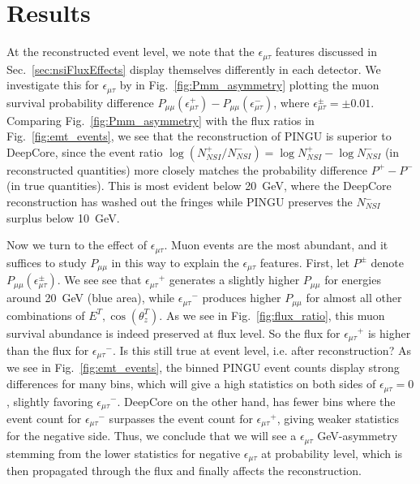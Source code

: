 \documentclass[draft=True]{revtex4-2}
\newcommand{\ztrue}{\ensuremath{\cos{(\theta_z^{T})}}}
\newcommand{\emt}{\ensuremath{\epsilon_{\mu\tau}}}
\newcommand{\Etrue}{E^{T}}
\begin{document}
\section{Results}
At the reconstructed event level, we note that the $\emt$ features discussed in Sec.~\ref{sec:nsiFluxEffects} display themselves differently in each detector.
We investigate this for $\emt$ by in Fig.~\ref{fig:Pmm_asymmetry} plotting the muon survival probability difference $P_{\mu\mu}(\epsilon^+_{\mu\tau}) - P_{\mu\mu}(\epsilon^-_{\mu\tau})$, where 
$\epsilon^\pm_{\mu\tau} = \pm 0.01$.
Comparing Fig.~\ref{fig:Pmm_asymmetry} with the flux ratios in Fig.~\ref{fig:emt_events}, we see that the reconstruction of PINGU is
superior to DeepCore, since the event ratio $\log{(N^+_{NSI}/N^-_{NSI})} = \log{N^+_{NSI}} - \log{N^-_{NSI}}$ (in reconstructed quantities) 
more closely matches the probability difference $P^+-P^-$ (in true quantities).
This is most evident below \SI{20}{\GeV}, where the DeepCore reconstruction has washed out the fringes while PINGU preserves the $N^-_{NSI}$ surplus below \SI{10}{\GeV}.

Now we turn to the effect of $\emt$. Muon events are the most abundant, and it suffices to study $P_{\mu\mu}$ in this way to explain the $\emt$ features. 
First, let $P^\pm$ denote $P_{\mu\mu}(\epsilon^\pm_{\mu\tau})$. 
We see see that $\emt^+$ generates a slightly higher $P_{\mu\mu}$ for energies around \SI{20}{\GeV} (blue area),
while $\emt^-$ produces higher $P_{\mu\mu}$ for almost all other combinations of ${\Etrue,\ztrue}$. As we see in Fig.~\ref{fig:flux_ratio}, this muon survival abundance 
is indeed preserved at flux level. So the flux for $\emt^+$ is higher than the flux for $\emt^-$. Is this still true at event level, i.e. after reconstruction? 
As we see in Fig.~\ref{fig:emt_events}, the binned PINGU event counts display strong differences for many bins, which will give a high statistics on both sides of $\emt=0$, slightly favoring $\emt^-$. 
DeepCore on the other hand, has fewer bins where the event count for $\emt^-$ surpasses the event count for $\emt^+$, 
giving weaker statistics for the negative side. Thus, we conclude that we will see a $\emt$ \si{GeV}-asymmetry stemming from the lower statistics 
for negative $\emt$ at probability level, which is then propagated through the flux and finally affects the reconstruction. %
\end{document}
